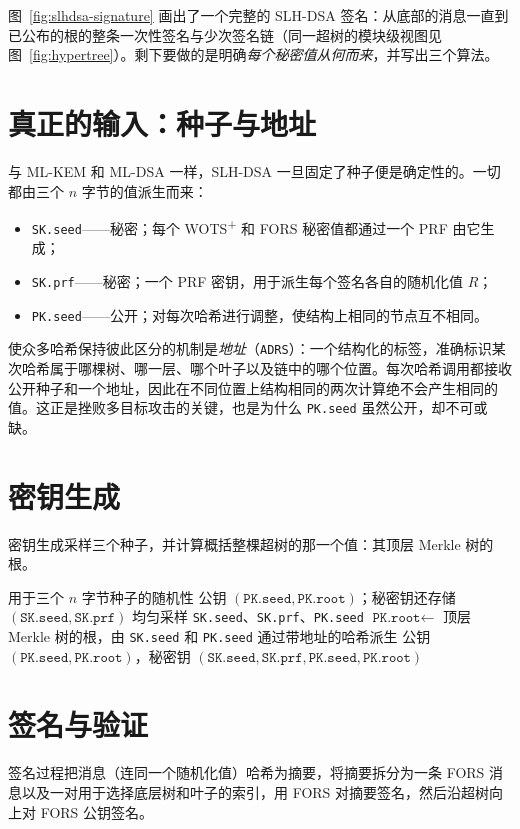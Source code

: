 图~\ref{fig:slhdsa-signature} 画出了一个完整的 SLH-DSA 签名：从底部的消息一直到已公布的根的整条一次性签名与少次签名链（同一超树的模块级视图见图~\ref{fig:hypertree}）。剩下要做的是明确\emph{每个秘密值从何而来}，并写出三个算法。

\section{真正的输入：种子与地址}
与 ML-KEM 和 ML-DSA 一样，SLH-DSA 一旦固定了种子便是确定性的。一切都由三个 $n$ 字节的值派生而来：

\begin{itemize}
  \item \texttt{SK.seed}——秘密；每个 WOTS\textsuperscript{+} 和 FORS 秘密值都通过一个 PRF 由它生成；
  \item \texttt{SK.prf}——秘密；一个 PRF 密钥，用于派生每个签名各自的随机化值 $R$；
  \item \texttt{PK.seed}——公开；对每次哈希进行调整，使结构上相同的节点互不相同。
\end{itemize}

使众多哈希保持彼此区分的机制是\emph{地址}（\texttt{ADRS}）：一个结构化的标签，准确标识某次哈希属于哪棵树、哪一层、哪个叶子以及链中的哪个位置。每次哈希调用都接收公开种子和一个地址，因此在不同位置上结构相同的两次计算绝不会产生相同的值。这正是挫败多目标攻击的关键，也是为什么 \texttt{PK.seed} 虽然公开，却不可或缺。

\section{密钥生成}
密钥生成采样三个种子，并计算概括整棵超树的那一个值：其顶层 Merkle 树的根。

\begin{algorithm}[H]
\caption{SLH-DSA.KeyGen（教学形式）}
\label{alg:slhdsa-keygen}
\begin{algorithmic}[1]
\Require 用于三个 $n$ 字节种子的随机性
\Ensure 公钥 $(\texttt{PK.seed},\texttt{PK.root})$；秘密钥还存储 $(\texttt{SK.seed},\texttt{SK.prf})$
\State 均匀采样 \texttt{SK.seed}、\texttt{SK.prf}、\texttt{PK.seed}
\State $\texttt{PK.root} \gets$ 顶层 Merkle 树的根，由 \texttt{SK.seed} 和 \texttt{PK.seed} 通过带地址的哈希派生
\State \Return 公钥 $(\texttt{PK.seed},\texttt{PK.root})$，秘密钥 $(\texttt{SK.seed},\texttt{SK.prf},\texttt{PK.seed},\texttt{PK.root})$
\end{algorithmic}
\end{algorithm}

\section{签名与验证}
签名过程把消息（连同一个随机化值）哈希为摘要，将摘要拆分为一条 FORS 消息以及一对用于选择底层树和叶子的索引，用 FORS 对摘要签名，然后沿超树向上对 FORS 公钥签名。

